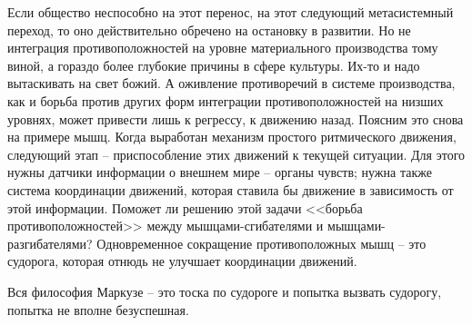 \documentclass{book}
\begin{document}
Если общество неспособно на этот перенос, на этот следу­ющий метасистемный переход, то оно действительно обречено на остановку в развитии. Но не интеграция противоположно­стей на уровне материального производства тому виной, а гораз­до более глубокие причины в сфере культуры. Их-то и надо вытаскивать на свет божий. А оживление противоречий в систе­ме производства, как и борьба против других форм интегра­ции противоположностей на низших уровнях, может привести лишь к регрессу, к движению назад. Поясним это снова на при­мере мышц. Когда выработан механизм простого ритмического движения, следующий этап -- приспособление этих движений к текущей ситуации. Для этого нужны датчики информации о внешнем мире -- органы чувств; нужна также система коор­динации движений, которая ставила бы движение в зависи­мость от этой информации. Поможет ли решению этой задачи <<борьба противоположностей>> между мышцами-сгибателями и мышцами-разгибателями? Одновременное сокращение проти­воположных мышц -- это судорога, которая отнюдь 
не улучшает координации движений.

Вся философия Маркузе -- это тоска по судороге и попытка вызвать судорогу, попытка не вполне безуспешная.
\end{document}
